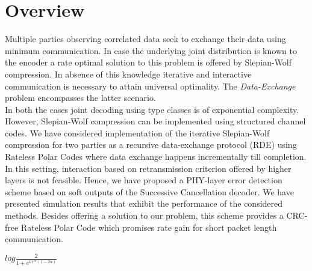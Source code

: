 \documentclass[
11pt, %
a4paper, %
oneside, %
headinclude,footinclude, %
BCOR5mm, %
]{scrartcl}
\begin{document}
\section*{Overview}
Multiple parties observing correlated data seek to exchange their data using minimum communication. In case the underlying joint distribution is known to the encoder a rate optimal solution to this problem is offered by Slepian-Wolf compression. In absence of this knowledge iterative and interactive communication is necessary to attain universal optimality. The \emph{Data-Exchange} problem  encompasses the latter scenario. \\In both the cases joint decoding using type classes is of exponential complexity. However, Slepian-Wolf compression can be implemented using structured channel codes. We have considered implementation of the iterative Slepian-Wolf compression for two parties as a recursive data-exchange protocol (RDE)  using Rateless Polar Codes where data exchange happens incrementally till completion. \\In this setting, interaction based on retransmission criterion offered by higher layers is not feasible.
Hence, we have  proposed a PHY-layer error detection scheme based on soft outputs of the Successive Cancellation decoder. We have presented simulation results that exhibit the performance of the considered methods.
Besides offering a solution to our problem, this scheme provides a CRC-free Rateless Polar Code which promises rate gain for short packet length communication.

$log \frac{2}{1+e^{llr*(1-2u)}}$

\newpage
\end{document}
